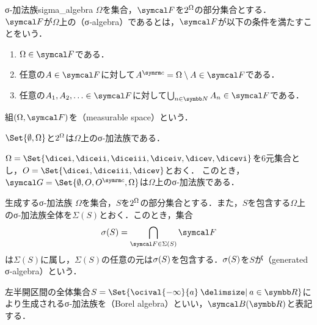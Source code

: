 \documentclass[../../main]{subfiles}
\begin{document}
\begin{definition}{σ‐加法族}{sigma_algebra}
  \(\Omega\)を集合，\(\sigmaalg{F}\)を\(2^{\Omega}\)の部分集合とする．
  \(\sigmaalg{F}\)が\(\Omega\)上の（σ‐algebra）であるとは，\(\sigmaalg{F}\)が以下の条件を満たすことをいう．
  \begin{enumerate}
    \item \(\Omega\in\sigmaalg{F}\)である．
    \item 任意の\(A\in\sigmaalg{F}\)に対して\(\scomp{A}=\Omega\setminus A\in\sigmaalg{F}\)である．
    \item 任意の\(A_1,A_2,\dotsc\in\sigmaalg{F}\)に対して\(\bigcup_{n\in\numset{N}}A_n\in\sigmaalg{F}\)である．
  \end{enumerate}
\end{definition}

組\((\Omega,\sigmaalg{F})\)を（measurable space）という．

\begin{example}
  \(\Set{\emptyset,\Omega}\)と\(2^{\Omega}\)は\(\Omega\)上のσ‐加法族である．
\end{example}

\begin{example}\label{example:dice}
  \(\Omega=\Set{\dicei,\diceii,\diceiii,\diceiv,\dicev,\dicevi}\)を6元集合とし，\(O=\Set{\dicei,\diceiii,\dicev}\)とおく．
  このとき，\(\sigmaalg{G}=\Set{\emptyset,O,\scomp{O},\Omega}\)は\(\Omega\)上のσ‐加法族である．
\end{example}

\begin{definition}{生成するσ‐加法族}{}
  \(\Omega\)を集合，\(S\)を\(2^{\Omega}\)の部分集合とする．また，\(S\)を包含する\(\Omega\)上のσ‐加法族全体を\(\Sigma(S)\)とおく．このとき，集合
  \[
    \sigmagen{S} = \bigcap_{\sigmaalg{F}\in\Sigma(S)}\sigmaalg{F}
  \]
  は\(\Sigma(S)\)に属し，\(\Sigma(S)\)の任意の元は\(\sigma(S)\)を包含する．\(\sigma(S)\)を\(S\)が（generated σ‐algebra）という．
\end{definition}

\begin{example}[ボレル集合族]
  左半開区間の全体集合\(S=\Set{\ocival{-\infty}{a}\given a\in\numset{R}}\)により生成されるσ‐加法族を（Borel algebra）といい，\(\borelset{\numset{R}}\)と表記する．
\end{example}
\end{document}
